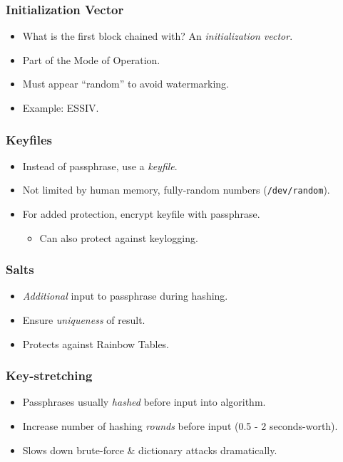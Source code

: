 \documentclass[xcolor={dvipsnames,svgnames},hyperref=dvips]{beamer}
\begin{document}
	\begin{frame}
		\frametitle{Initialization Vector}
		\begin{itemize}
		\item What is the first block chained with? An \textit{initialization vector}.
		\item Part of the Mode of Operation.
		\item Must appear ``random'' to avoid watermarking.
		\item Example: ESSIV.
		\end{itemize}
	\end{frame}

	\begin{frame}
		\frametitle{Keyfiles}
		\begin{itemize}
		\item Instead of passphrase, use a \textit{keyfile}.
		\item Not limited by human memory, fully-random numbers (\texttt{/dev/random}).
		\item For added protection, encrypt keyfile with passphrase.
			\begin{itemize}
			\item Can also protect against keylogging.
			\end{itemize}
		\end{itemize}
	\end{frame}

	\begin{frame}
		\frametitle{Salts}
		\begin{itemize}
		\item \textit{Additional} input to passphrase during hashing.
		\item Ensure \textit{uniqueness} of result.
		\item Protects against Rainbow Tables.
		\end{itemize}
	\end{frame}

	\begin{frame}
		\frametitle{Key-stretching}
		\begin{itemize}
		\item Passphrases usually \textit{hashed} before input into algorithm.
		\item Increase number of hashing \textit{rounds} before input (0.5 - 2 seconds-worth).
		\item Slows down brute-force \& dictionary attacks dramatically.
		\end{itemize}
	\end{frame}
\end{document}
